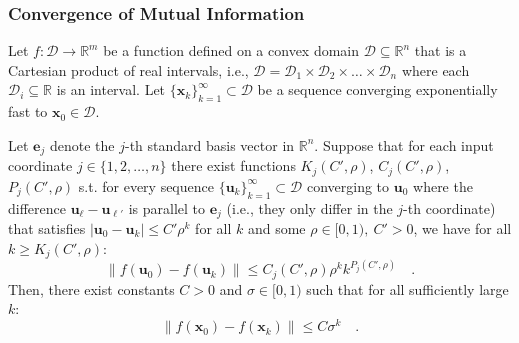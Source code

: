 \documentclass[../../main.tex]{subfiles}
\begin{document}
\subsubsection{Convergence of Mutual Information}
\begin{theorem}
    \label{theorem:element-wise_exponential_convergence_implies_exponential_convergence}
Let $f: \mathcal{D} \to \mathbb{R}^m$ be a function defined on a convex domain $\mathcal{D} \subseteq \mathbb{R}^n$ that is a Cartesian product of real intervals, i.e., $\mathcal{D} = \mathcal{D}_1 \times \mathcal{D}_2 \times \dots \times \mathcal{D}_n$ where each $\mathcal{D}_i \subseteq \mathbb{R}$ is an interval. Let $\{\bm{x}_k\}_{k=1}^\infty \subset \mathcal{D}$ be a sequence converging exponentially fast to $\bm{x}_0 \in \mathcal{D}$.

Let $\bm{e}_j$ denote the $j$-th standard basis vector in $\mathbb{R}^n$. Suppose that for each input coordinate $j \in \{1, 2, \dots, n\}$ there exist functions $K_j(C', \rho)$, $C_j(C', \rho)$, $P_j(C', \rho)$ s.t. for every sequence $\{\bm{u}_k\}_{k=1}^\infty \subset \mathcal{D}$ converging to $\bm{u}_0$ where the difference $\bm{u}_\ell-\bm{u}_{\ell'}$ is parallel to $\bm{e}_j$ (i.e., they only differ in the $j$-th coordinate) that satisfies $|\bm{u}_0 - \bm{u}_k| \leq C' \rho^k$ for all $k$ and some $\rho \in [0, 1), \ C' > 0$, we have for all $k \geq K_j(C', \rho)$:
\[
    \|f(\bm{u}_0) - f(\bm{u}_k)\| \le C_j(C', \rho) \rho^k k^{P_j(C', \rho)} \quad .
\]
Then, there exist constants $C > 0$ and $\sigma \in [0, 1)$ such that for all sufficiently large $k$:
\[
    \|f(\bm{x}_0) - f(\bm{x}_k)\| \le C \sigma^k \quad .
\]
\end{theorem}
\end{document}
